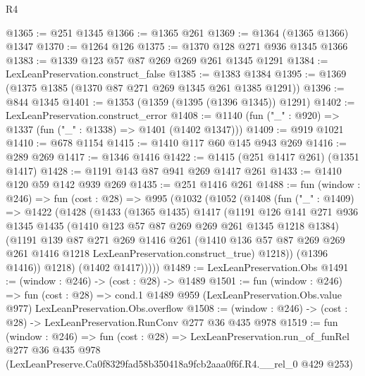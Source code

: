\begin{lexlean}{R4}
\begin{coremodule}
@1365 := @251 @1345
@1366 := @1365 @261
@1369 := @1364 (@1365 @1366) @1347
@1370 := @1264 @126
@1375 := @1370 @128 @271 @936 @1345 @1366
@1383 := @1339 @123 @57 @87 @269 @269 @261 @1345 @1291
@1384 := LexLeanPreservation.construct_false
@1385 := @1383 @1384
@1395 := @1369 (@1375 @1385 (@1370 @87 @271 @269 @1345 @261 @1385 @1291))
@1396 := @844 @1345
@1401 := @1353 (@1359 (@1395 (@1396 @1345)) @1291)
@1402 := LexLeanPreservation.construct_error
@1408 := @1140 (fun ("_" : @920) => @1337 (fun ("_" : @1338) => @1401 (@1402 @1347)))
@1409 := @919 @1021
@1410 := @678 @1154
@1415 := @1410 @117 @60 @145 @943 @269
@1416 := @289 @269
@1417 := @1346 @1416
@1422 := @1415 (@251 @1417 @261) (@1351 @1417)
@1428 := @1191 @143 @87 @941 @269 @1417 @261
@1433 := @1410 @120 @59 @142 @939 @269
@1435 := @251 @1416 @261
@1488 := fun (window : @246) =>
  fun (cost : @28) =>
  @995
    (@1032
      (@1052
        (@1408
          (fun ("_" : @1409) =>
          @1422
            (@1428
              (@1433
                (@1365 @1435)
                @1417
                (@1191
                  @126
                  @141
                  @271
                  @936
                  @1345
                  @1435
                  (@1410 @123 @57 @87 @269 @269 @261 @1345 @1218 @1384)
                  (@1191
                    @139
                    @87
                    @271
                    @269
                    @1416
                    @261
                    (@1410
                      @136
                      @57
                      @87
                      @269
                      @269
                      @261
                      @1416
                      @1218
                      LexLeanPreservation.construct_true)
                    @1218))
                (@1396 @1416))
              @1218)
            (@1402 @1417)))))
@1489 := LexLeanPreservation.Obs
@1491 := (window : @246) -> (cost : @28) -> @1489
@1501 := fun (window : @246) =>
  fun (cost : @28) =>
  cond.{1} @1489 @959 (LexLeanPreservation.Obs.value @977) LexLeanPreservation.Obs.overflow
@1508 := (window : @246) -> (cost : @28) -> LexLeanPreservation.RunConv @277 @36 @435 @978
@1519 := fun (window : @246) =>
  fun (cost : @28) =>
  LexLeanPreservation.run_of_funRel
    @277
    @36
    @435
    @978
    (LexLeanPreserve.Ca0f8329fad58b350418a9fcb2aaa0f6f.R4.__rel_0 @429 @253)
\end{coremodule}
\end{lexlean}
